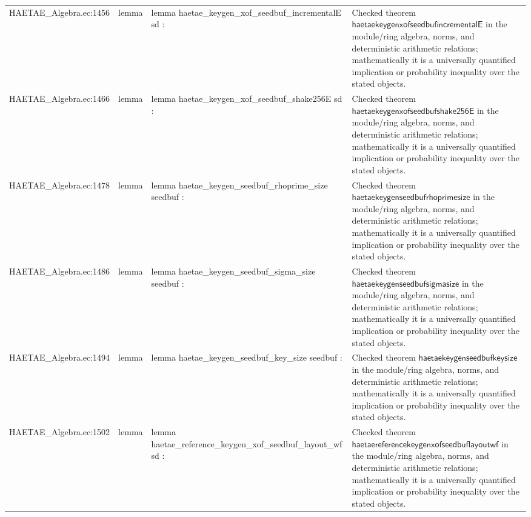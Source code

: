 \documentclass[10pt]{article}
\begin{document}
\begin{longtable}{L{0.11\textwidth}L{0.055\textwidth}L{0.385\textwidth}L{0.41\textwidth}}
HAETAE\_\allowbreak{}Algebra.\allowbreak{}ec:\allowbreak{}1456 & lemma & {\ttfamily\scriptsize lemma haetae\_\allowbreak{}keygen\_\allowbreak{}xof\_\allowbreak{}seedbuf\_\allowbreak{}incrementalE sd :} & Checked theorem $\mathsf{haetaekeygenxofseedbufincrementalE}$ in the module/ring algebra, norms, and deterministic arithmetic relations; mathematically it is a universally quantified implication or probability inequality over the stated objects. \\
HAETAE\_\allowbreak{}Algebra.\allowbreak{}ec:\allowbreak{}1466 & lemma & {\ttfamily\scriptsize lemma haetae\_\allowbreak{}keygen\_\allowbreak{}xof\_\allowbreak{}seedbuf\_\allowbreak{}shake256E sd :} & Checked theorem $\mathsf{haetaekeygenxofseedbufshake256E}$ in the module/ring algebra, norms, and deterministic arithmetic relations; mathematically it is a universally quantified implication or probability inequality over the stated objects. \\
HAETAE\_\allowbreak{}Algebra.\allowbreak{}ec:\allowbreak{}1478 & lemma & {\ttfamily\scriptsize lemma haetae\_\allowbreak{}keygen\_\allowbreak{}seedbuf\_\allowbreak{}rhoprime\_\allowbreak{}size seedbuf :} & Checked theorem $\mathsf{haetaekeygenseedbufrhoprimesize}$ in the module/ring algebra, norms, and deterministic arithmetic relations; mathematically it is a universally quantified implication or probability inequality over the stated objects. \\
HAETAE\_\allowbreak{}Algebra.\allowbreak{}ec:\allowbreak{}1486 & lemma & {\ttfamily\scriptsize lemma haetae\_\allowbreak{}keygen\_\allowbreak{}seedbuf\_\allowbreak{}sigma\_\allowbreak{}size seedbuf :} & Checked theorem $\mathsf{haetaekeygenseedbufsigmasize}$ in the module/ring algebra, norms, and deterministic arithmetic relations; mathematically it is a universally quantified implication or probability inequality over the stated objects. \\
HAETAE\_\allowbreak{}Algebra.\allowbreak{}ec:\allowbreak{}1494 & lemma & {\ttfamily\scriptsize lemma haetae\_\allowbreak{}keygen\_\allowbreak{}seedbuf\_\allowbreak{}key\_\allowbreak{}size seedbuf :} & Checked theorem $\mathsf{haetaekeygenseedbufkeysize}$ in the module/ring algebra, norms, and deterministic arithmetic relations; mathematically it is a universally quantified implication or probability inequality over the stated objects. \\
HAETAE\_\allowbreak{}Algebra.\allowbreak{}ec:\allowbreak{}1502 & lemma & {\ttfamily\scriptsize lemma haetae\_\allowbreak{}reference\_\allowbreak{}keygen\_\allowbreak{}xof\_\allowbreak{}seedbuf\_\allowbreak{}layout\_\allowbreak{}wf sd :} & Checked theorem $\mathsf{haetaereferencekeygenxofseedbuflayoutwf}$ in the module/ring algebra, norms, and deterministic arithmetic relations; mathematically it is a universally quantified implication or probability inequality over the stated objects. \\

\end{longtable}
\end{document}

